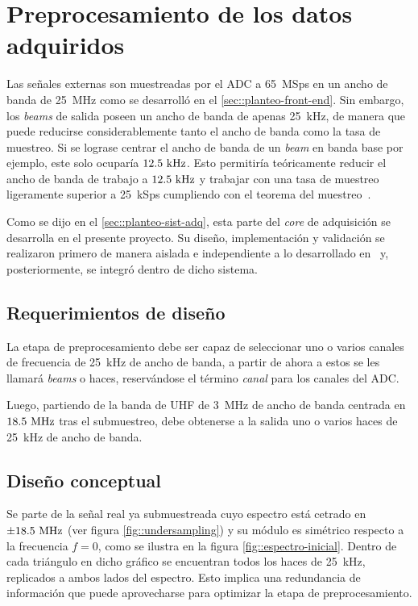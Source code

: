 \documentclass[../../main.tex]{subfiles}
\begin{document}
\graphicspath{{./figures}}
\chapter{Preprocesamiento de los datos adquiridos}\label{cap::preproc}
Las señales externas son muestreadas por el ADC a 65~MSps en un ancho de banda de 25~MHz como se desarrolló en el \cref{sec::planteo-front-end}. Sin embargo, los \textit{beams} de salida poseen un ancho de banda de apenas 25~kHz, de manera que puede reducirse considerablemente tanto el ancho de banda como la tasa de muestreo. Si se lograse centrar el ancho de banda de un  \textit{beam} en banda base por ejemplo, este solo ocuparía $12.5~\textrm{kHz}$. Esto permitiría teóricamente reducir el ancho de banda de trabajo a $12.5~\textrm{kHz}$ y trabajar con una tasa de muestreo ligeramente superior a 25~kSps cumpliendo con el teorema del muestreo~\cite{teorema-del-muestreo}.

Como se dijo en el \cref{sec::planteo-sist-adq}, esta parte del \textit{core} de adquisición se desarrolla en el presente proyecto. Su diseño, implementación y validación se realizaron primero de manera aislada e independiente a lo desarrollado en~\cite{proyecto-jose} y, posteriormente, se integró dentro de dicho sistema.

\section{Requerimientos de diseño}
La etapa de preprocesamiento debe ser capaz de seleccionar uno o varios canales de frecuencia de 25~kHz de ancho de banda, a partir de ahora a estos se les llamará \textit{beams} o haces, reservándose el término \textit{canal} para los canales del ADC.

Luego, partiendo de la banda de UHF de 3~MHz de ancho de banda centrada en $18.5~\textrm{MHz}$ tras el submuestreo, debe obtenerse a la salida uno o varios haces de 25~kHz de ancho de banda.

\section{Diseño conceptual}\label{sec::disenio-conceptual-preproc}
Se parte de la señal real ya submuestreada cuyo espectro está cetrado en $\pm 18.5~\textrm{MHz}$ (ver figura \ref{fig::undersampling}) y su módulo  es simétrico respecto a la frecuencia $f = 0$, como se ilustra en la figura \ref{fig::espectro-inicial}. Dentro de cada triángulo en dicho gráfico se encuentran todos los haces de 25~kHz, replicados a ambos lados del espectro. Esto implica una redundancia de información que puede aprovecharse para optimizar la etapa de preprocesamiento.
\end{document}
